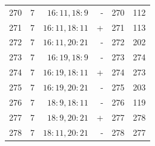 \begin{center}
\begin{tabular}{rrrrrr}
270 & 7 & $16:11,18:9$ & - & 270 & 112\\
271 & 7 & $16:11,18:11$ & + & 271 & 113\\
272 & 7 & $16:11,20:21$ & - & 272 & 202\\
273 & 7 & $16:19,18:9$ & - & 273 & 274\\
274 & 7 & $16:19,18:11$ & + & 274 & 273\\
275 & 7 & $16:19,20:21$ & - & 275 & 203\\
276 & 7 & $18:9,18:11$ & - & 276 & 119\\
277 & 7 & $18:9,20:21$ & + & 277 & 278\\
278 & 7 & $18:11,20:21$ & - & 278 & 277\\
\bottomrule\end{tabular}\end{center}\clearpage
\normalsize